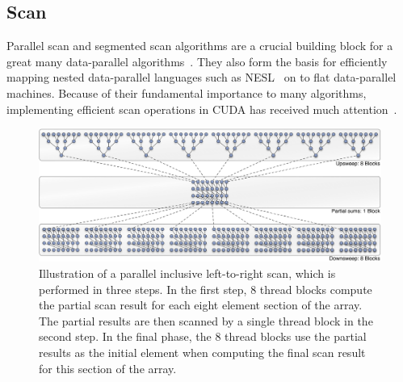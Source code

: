 \subsection{Scan}
\label{sec:parallel_scan}

Parallel scan and segmented scan algorithms are a crucial building block for a
great many data-parallel algorithms~\cite{Blelloch:1990ts,Chatterjee:1990vj}.
They also form the basis for efficiently mapping nested data-parallel languages
such as NESL~\cite{Blelloch:1995ut,Blelloch:1996jx} on to flat data-parallel
machines. Because of their fundamental importance to many algorithms,
implementing efficient scan operations in CUDA\cuda{} has received much
attention~\cite{Sengupta:2007tc,Sengupta:2008ut,Dotsenko:2008fo,Harris:2012fy}.

\begin{figure}
    \begin{center}
        \includegraphics[width=\textwidth]{images/basics/scan}
    \end{center}
    \caption[A parallel inclusive scan]{Illustration of a parallel inclusive
        left-to-right scan, which is performed in three steps. In the first
        step, 8 thread blocks compute the partial scan result for each eight
        element section of the array. The partial results are then scanned by a
        single thread block in the second step. In the final phase, the 8 thread
        blocks use the partial results as the initial element when computing the
        final scan result for this section of the array.}
    \label{fig:fast_scan}
\end{figure}

